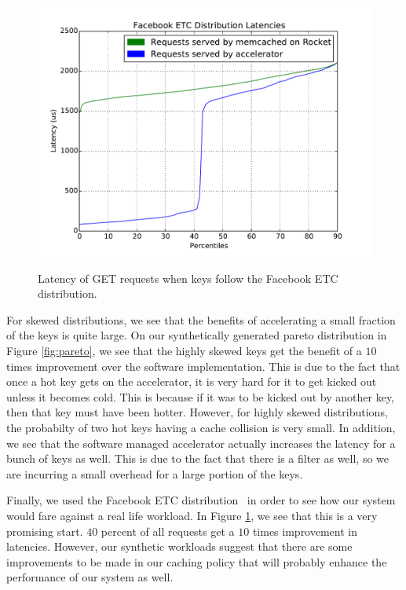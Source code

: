 \begin{figure}[t]
\begin{center}
\label{fig:etc}
\includegraphics[width=\linewidth]{etc.pdf}
\caption{Latency of GET requests when keys follow the Facebook ETC distribution.}
\end{center}
\end{figure}

For skewed distributions, we see that the benefits of accelerating a small
fraction of the keys is quite large. On our synthetically generated pareto
distribution in Figure \ref{fig:pareto}, we see that the highly skewed keys get the
benefit of a $10$ times improvement over the software implementation. This is
due to the fact that once a hot key gets on the accelerator, it is very hard
for it to get kicked out unless it becomes cold. This is because if it was to
be kicked out by another key, then that key must have been hotter. However, for
highly skewed distributions, the probabilty of two hot keys having a cache
collision is very small. In addition, we see that the software managed
accelerator actually increases the latency for a bunch of keys as well. This is
due to the fact that there is a filter as well, so we are incurring a small
overhead for a large portion of the keys.

Finally, we used the Facebook ETC distribution~\cite{AXFJP2012} in order to see
how our system would fare against a real life workload. In Figure
\ref{fig:etc}, we see that this is a very promising start. $40$ percent of all
requests get a $10$ times improvement in latencies. However, our synthetic
workloads suggest that there are some improvements to be made in our caching
policy that will probably enhance the performance of our system as well.
